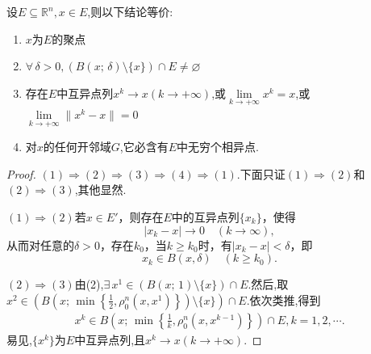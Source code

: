 \documentclass[../../main.tex]{subfiles}%
\begin{document}
\begin{theorem}\label{theorem:聚点的充要条件--实变函数}
设$E\subseteq\mathbb{R}^n,x\in E$,则以下结论等价:
\begin{enumerate}[(1)]
\item $x$为$E$的聚点

\item\label{theorem:聚点的充要条件--实变函数-2} $\forall\,\delta>0,(B(x;\,\delta)\setminus\{x\})\cap E\neq\varnothing$

\item 存在$E$中互异点列$x^k\to x(k\to+\infty)$,或$\lim\limits_{k\to+\infty}x^k=x$,或$\lim\limits_{k\to+\infty}\|x^k-x\|=0$

\item 对$x$的任何开邻域$G$,它必含有$E$中无穷个相异点.
\end{enumerate}
\end{theorem}
\begin{proof}

$(1)\Rightarrow(2)\Rightarrow(3)\Rightarrow(4)\Rightarrow(1)$.下面只证$(1)\Rightarrow(2)$和$(2)\Rightarrow(3)$,其他显然.

$(1)\Rightarrow(2)$若\(x\in E'\)，则存在\(E\)中的互异点列\(\{x_k\}\)，使得
\[|x_k - x|\to 0\quad(k\to\infty),\]
从而对任意的\(\delta>0\)，存在\(k_0\)，当\(k\geqslant k_0\)时，有\(|x_k - x|<\delta\)，即
\[x_k\in B(x,\delta)\quad(k\geqslant k_0).\]

$(2)\Rightarrow(3)$由(2),$\exists\,x^1\in(B(x;\,1)\setminus\{x\})\cap E$.然后,取$x^2\in\left(B\left(x;\,\min\left\{\frac{1}{2},\rho_0^n(x,x^1)\right\}\right)\setminus\{x\}\right)\cap E$.依次类推,得到
\begin{align*}
x^k\in B\left(x;\,\min\left\{\frac{1}{k},\rho_0^n(x,x^{k-1})\right\}\right)\cap E,k=1,2,\cdots.
\end{align*}
易见,$\{x^k\}$为$E$中互异点列,且$x^k\to x(k\to+\infty)$.

\end{proof}
\end{document}
